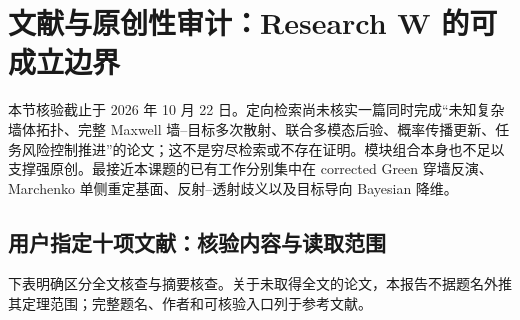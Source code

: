 \section{文献与原创性审计：Research W 的可成立边界}

本节核验截止于 2026 年 10 月 22 日。定向检索尚未核实一篇同时完成“未知复杂墙体拓扑、完整 Maxwell 墙--目标多次散射、联合多模态后验、概率传播更新、任务风险控制推进”的论文；这不是穷尽检索或不存在证明。模块组合本身也不足以支撑强原创。最接近本课题的已有工作分别集中在 corrected Green 穿墙反演、Marchenko 单侧重定基面、反射--透射歧义以及目标导向 Bayesian 降维。

\subsection{用户指定十项文献：核验内容与读取范围}

下表明确区分全文核查与摘要核查。关于未取得全文的论文，本报告不据题名外推其定理范围；完整题名、作者和可核验入口列于参考文献。

